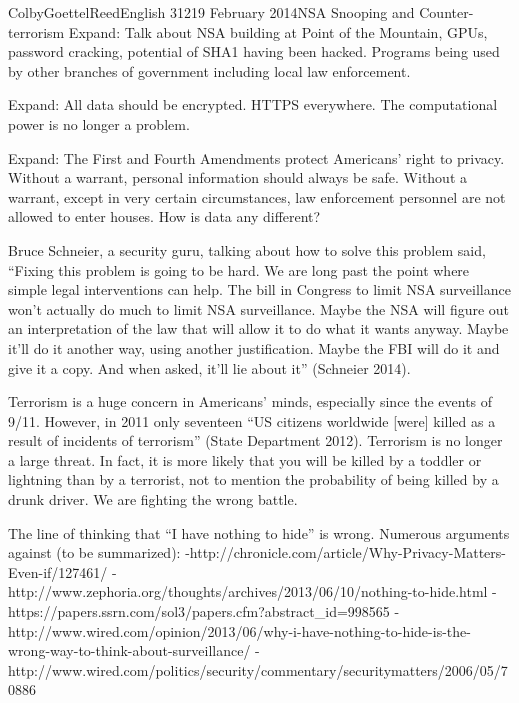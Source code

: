 \documentclass[12pt]{article}
\begin{document}
\begin{mla}{Colby}{Goettel}{Reed}{English 312}{19 February 2014}{NSA Snooping and Counter-terrorism}
Expand: Talk about NSA building at Point of the Mountain, GPUs, password cracking, potential of SHA1 having been hacked. Programs being used by other branches of government including local law enforcement.

Expand: All data should be encrypted. HTTPS everywhere. The computational power is no longer a problem.

Expand: The First and Fourth Amendments protect Americans' right to privacy. Without a warrant, personal information should always be safe. Without a warrant, except in very certain circumstances, law enforcement personnel are not allowed to enter houses. How is data any different?

Bruce Schneier, a security guru, talking about how to solve this problem said, ``Fixing this problem is going to be hard. We are long past the point where simple legal interventions can help. The bill in Congress to limit NSA surveillance won't actually do much to limit NSA surveillance. Maybe the NSA will figure out an interpretation of the law that will allow it to do what it wants anyway. Maybe it'll do it another way, using another justification. Maybe the FBI will do it and give it a copy. And when asked, it'll lie about it'' (Schneier 2014).

Terrorism is a huge concern in Americans' minds, especially since the events of 9/11. However, in 2011 only seventeen ``US citizens worldwide [were] killed as a result of incidents of terrorism'' (State Department 2012). Terrorism is no longer a large threat. In fact, it is more likely that you will be killed by a toddler or lightning than by a terrorist, not to mention the probability of being killed by a drunk driver. We are fighting the wrong battle.

The line of thinking that ``I have nothing to hide'' is wrong. Numerous arguments against (to be summarized):
-http://chronicle.com/article/Why-Privacy-Matters-Even-if/127461/
-http://www.zephoria.org/thoughts/archives/2013/06/10/nothing-to-hide.html
-https://papers.ssrn.com/sol3/papers.cfm?abstract\_id=998565
-http://www.wired.com/opinion/2013/06/why-i-have-nothing-to-hide-is-the-wrong-way-to-think-about-surveillance/
-http://www.wired.com/politics/security/commentary/securitymatters/2006/05/70886


\end{mla}
\end{document}
